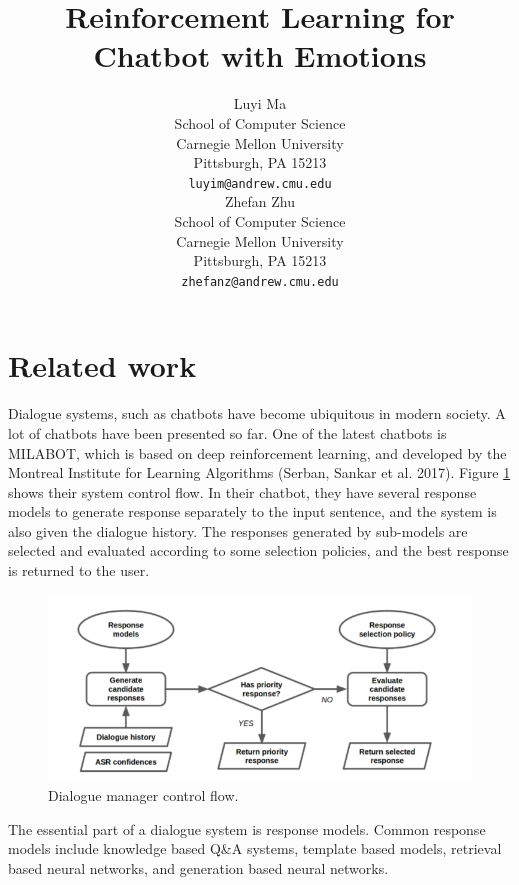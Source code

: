 \documentclass{article}
\title{Reinforcement Learning for Chatbot with Emotions}
\author{
  Luyi Ma \\
  School of Computer Science\\
  Carnegie Mellon University\\
  Pittsburgh, PA 15213 \\
  \texttt{luyim@andrew.cmu.edu} \\
  \And
  Zhefan Zhu \\
  School of Computer Science \\
  Carnegie Mellon University\\
  Pittsburgh, PA 15213 \\
  \texttt{zhefanz@andrew.cmu.edu} \\  
}
\begin{document}

\maketitle






\section{Related work}

Dialogue systems, such as chatbots have become ubiquitous in modern society. A lot of chatbots have been presented so far. One of the latest chatbots is MILABOT, which is based on deep reinforcement learning, and developed by the Montreal Institute for Learning Algorithms (Serban, Sankar et al. 2017). Figure \ref{fig:dialoguesystem} shows their system control flow. In their chatbot, they have several response models to generate response separately to the input sentence, and the system is also given the dialogue history. The responses generated by sub-models are selected and evaluated according to some selection policies, and the best response is returned to the user. \par 





\begin{figure}
\begin{center}
\includegraphics[scale=0.4]{figure1.png}
\caption{Dialogue manager control flow.}
\label{fig:dialoguesystem}
\end{center}
\end{figure}


The essential part of a dialogue system is response models. Common response models include knowledge based Q\&A systems, template based models, retrieval based neural networks, and generation based neural networks. \par
\end{document}
